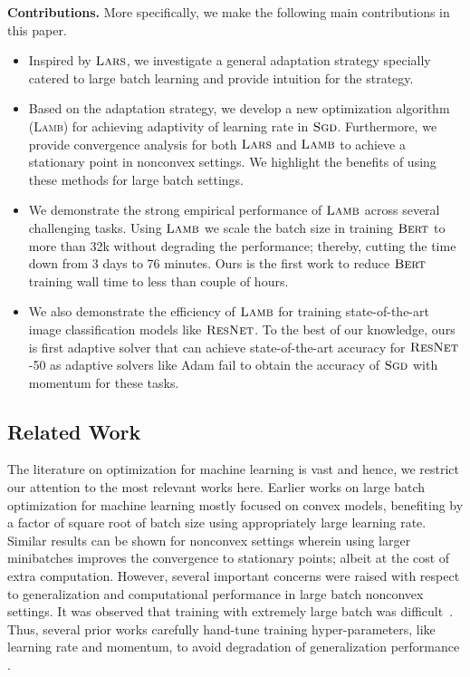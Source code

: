 \documentclass{article} \usepackage{iclr2020_conference,times}
\newcommand{\resnet}{\textsc{ResNet}}
\newcommand{\bert}{\textsc{Bert}\xspace}
\newcommand{\sgd}{\textsc{Sgd}\xspace}
\newcommand{\lamb}{\textsc{Lamb}}
\newcommand{\lars}{\textsc{Lars}}
\begin{document}
{\bf Contributions.} More specifically, we make the following main contributions in this paper.

\begin{itemize}
\item Inspired by $\lars$, we investigate a general adaptation strategy specially catered to large batch learning and provide intuition for the strategy.
\item Based on the adaptation strategy, we develop a new optimization algorithm (\lamb) for achieving adaptivity of learning rate in $\sgd$. Furthermore, we provide convergence analysis for both $\lars$ and $\lamb$ to achieve a stationary point in nonconvex settings. We highlight the benefits of using these methods for large batch settings.
\item We demonstrate the strong empirical performance of $\lamb$ across several challenging tasks. Using $\lamb$ we scale the batch size in training $\bert$ to more than 32k without degrading the performance; thereby, cutting the time down from 3 days to 76 minutes. Ours is the first work to reduce $\bert$ training wall time to less than couple of hours.
\item We also demonstrate the efficiency of $\lamb$ for training state-of-the-art image classification models like $\resnet$. To the best of our knowledge, ours is first adaptive solver that can achieve state-of-the-art accuracy for $\resnet$-50 as adaptive solvers like Adam fail to obtain the accuracy of $\sgd$ with momentum for these tasks.
\end{itemize}

\subsection{Related Work}

The literature on optimization for machine learning is vast and hence, we restrict our attention to the most relevant works here. Earlier works on large batch optimization for machine learning mostly focused on convex models, benefiting by a factor of square root of batch size using appropriately large learning rate. Similar results can be shown for nonconvex settings wherein using larger minibatches improves the convergence to stationary points; albeit at the cost of extra computation. However, several important concerns were raised with respect to generalization and computational performance in large batch nonconvex settings. It was observed that training with extremely large batch was difficult~\citep{keskar2016large, hoffer2017train}. Thus, several prior works carefully hand-tune training hyper-parameters, like learning rate and momentum, to avoid degradation of generalization performance \citep{goyal2017accurate, li2017scaling, you2018imagenet, shallue2018measuring}. 
\end{document}
